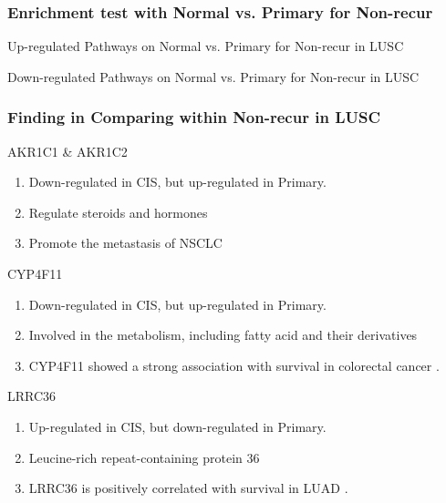 \documentclass{beamer}
\begin{document}
    \begin{frame}
        \frametitle{Enrichment test with Normal vs. Primary for Non-recur}

        \begin{table}
            \caption{Up-regulated Pathways on Normal vs. Primary for Non-recur in LUSC}
            \resizebox{\linewidth}{!}
            {}
        \end{table}

        \begin{table}
            \caption{Down-regulated Pathways on Normal vs. Primary for Non-recur in LUSC}
            \resizebox{\linewidth}{!}
            {}
        \end{table}
    \end{frame}

    \begin{frame}[allowframebreaks]
        \frametitle{Finding in Comparing within Non-recur in LUSC}

        \begin{block}{AKR1C1 \& AKR1C2}
            \begin{enumerate}
                \item Down-regulated in CIS, but up-regulated in Primary.
                \item Regulate steroids \cite{AKR1C1-1} and hormones \cite{AKR1C1-2}
                \item Promote the metastasis of NSCLC \cite{AKR1C1-3}
            \end{enumerate}
        \end{block}

        \begin{block}{CYP4F11}
            \begin{enumerate}
                \item Down-regulated in CIS, but up-regulated in Primary.
                \item Involved in the metabolism, including fatty acid and their derivatives \cite{CYP4F11-1, CYP4F11-2, CYP4F11-3}
                \item CYP4F11 showed a strong association with survival in colorectal cancer \cite{CYP4F11-4}.
            \end{enumerate}
        \end{block}

        \begin{block}{LRRC36}
            \begin{enumerate}
                \item Up-regulated in CIS, but down-regulated in Primary.
                \item Leucine-rich repeat-containing protein 36
                \item LRRC36 is positively correlated with survival in LUAD \cite{LRRC36-1}.
            \end{enumerate}
        \end{block}
    \end{frame}
\end{document}
